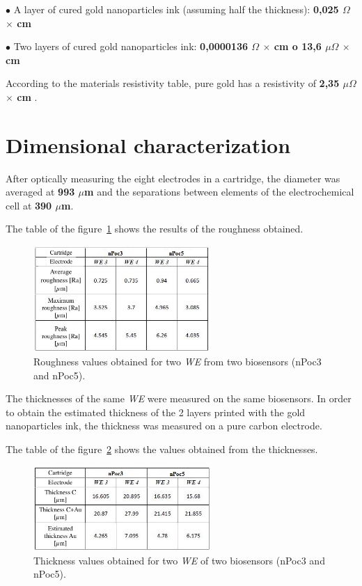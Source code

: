 $\bullet$ A layer of cured gold nanoparticles ink (assuming half the thickness): \textbf{0,025 $\Omega$ $\times$ cm}

$\bullet$ Two layers of cured gold nanoparticles ink: \textbf{0,0000136 $\Omega$ $\times$ cm o 13,6 $\mu\Omega$ $\times$ cm}

According to the materials resistivity table, pure gold has a resistivity of \textbf{2,35 $\mu\Omega$ $\times$ cm} \cite{Resistividad}.

\section{Dimensional characterization}
After optically measuring the eight electrodes in a cartridge, the diameter was averaged at \textbf{993 $\mu$m} and the separations between elements of the electrochemical cell at \textbf{390 $\mu$m}.

The table of the figure~\ref{fig:Figura_tabla_rugosidades} shows the results of the roughness obtained.

\begin{figure}[H]
  \centering
    \includegraphics[width=0.6\textwidth]{Figures/Figura_tabla_rugosidades}
  \caption{Roughness values obtained for two \emph{WE} from two biosensors (nPoc3 and nPoc5).}
  \label{fig:Figura_tabla_rugosidades}
\end{figure}

The thicknesses of the same \emph{WE} were measured on the same biosensors. In order to obtain the estimated thickness of the 2 layers printed with the gold nanoparticles ink, the thickness was measured on a pure carbon electrode.

The table of the figure~\ref{fig:Figura_tabla_espesores} shows the values obtained from the thicknesses.

\begin{figure}[H]
  \centering
    \includegraphics[width=0.6\textwidth]{Figures/Figura_tabla_espesores}
  \caption{Thickness values obtained for two \emph{WE} of two biosensors (nPoc3 and nPoc5).}
  \label{fig:Figura_tabla_espesores}
\end{figure}

